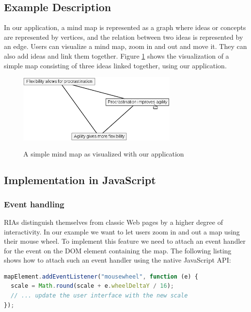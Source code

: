 \documentclass[american,english,runningheads]{llncs}
\begin{document}
\subsection{Example Description}

In our application, a mind map is represented as a graph where ideas or concepts are represented by vertices, and the
relation between two ideas is represented by an edge. Users can visualize a mind map, zoom in and out and move it.
They can also add ideas and link them together. Figure \ref{mindmap} shows the visualization of a simple map
consisting of three ideas linked together, using our application.

\begin{figure}
 \caption{A simple mind map as visualized with our application}
 \centering
 \includegraphics[width=8cm]{mindmap.png}
 \label{mindmap}
\end{figure}

\subsection{Implementation in JavaScript}

\subsubsection{Event handling}

RIAs distinguish themselves from classic Web pages by a higher degree of interactivity. In our example we want to let users zoom
in and out a map using their mouse wheel. To implement this feature we need to attach an event handler for the
 event on the DOM element containing the map. The following listing shows how to attach such an
event handler using the native JavaScript API:

\begin{lstlisting}[language=JavaScript,label=event-js,caption=Native JavaScript API to handle events]
mapElement.addEventListener("mousewheel", function (e) {
  scale = Math.round(scale + e.wheelDeltaY / 16);
  // ... update the user interface with the new scale
});
\end{lstlisting}
\end{document}
